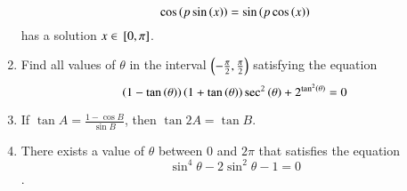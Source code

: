 \begin{enumerate}[label=\thesubsection.\arabic*,ref=\thesubsection.\theenumi]
$$
\cos {\ensuremath{\left(p\sin \left(x\right)\right)}}=\sin {\ensuremath{\left(p\cos \left(x\right)\right)}}
$$
has a solution $ x \in {}\left[0, \pi\right]$.
\item Find all values of $\theta$ in the interval $\left(-\frac{\pi}{2},\frac{\pi}{2}\right)$ satisfying the equation 
\hfill{}
$$
\left(1-\tan \left(\theta\right)\right)\left(1+\tan \left(\theta\right)\right)\sec^2\left(\theta\right)+ 2^{\tan^2\left(\theta\right)}=0
$$
\item If $\tan A = \frac{1-\cos B}{\sin B}$, then $\tan 2A = \tan B$.
\hfill{}
\item There exists a value of $\theta$ between $0$ and $2\pi$ that satisfies the equation $$\sin^{4}\theta -2\sin^{2}\theta-1=0$$. 
\hfill{}

\end{enumerate}
